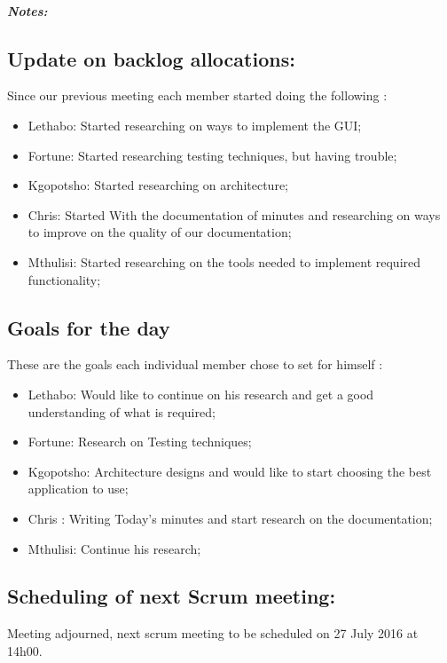 \documentclass{article}
\begin{document}
\subparagraph{Notes:\\}

\subsection{Update on backlog allocations: }
Since our previous meeting each member started doing the following :\\  
\begin{itemize}
	\item Lethabo: Started researching on ways to implement the GUI;
	\item Fortune: Started researching testing techniques, but having trouble;
	\item Kgopotsho: Started researching on architecture;
	\item Chris: Started With the documentation of minutes and researching on ways to improve on the quality of our documentation;
	\item Mthulisi: Started researching on the tools needed to implement required functionality; 
\end{itemize}

\subsection{Goals for the day}
These are the goals each individual member chose to set for himself :\\
\begin{itemize}
	\item Lethabo: Would like to continue on his research and get a good understanding of what is required; 
	\item Fortune: Research on Testing techniques;
	\item Kgopotsho: Architecture designs and would like to start choosing the best application to use;
	\item Chris : Writing Today's minutes and start research on the documentation;
	\item Mthulisi: Continue his research;
\end{itemize}

\subsection{Scheduling of next Scrum meeting:}
Meeting adjourned, next scrum meeting to be scheduled on 27 July 2016 at 14h00. \\
\end{document}
